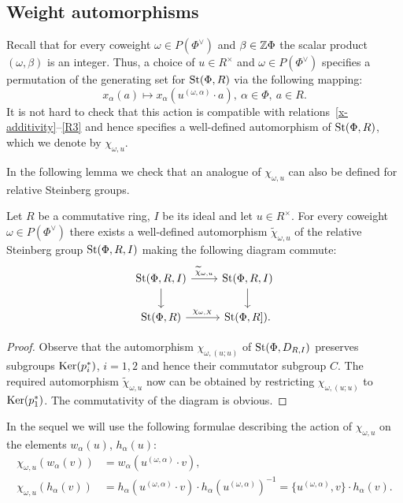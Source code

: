 \subsection{Weight automorphisms}\label{subsec:weight-automorphisms}
Recall that for every coweight $\omega \in P(\Phi^\vee)$ and $\beta \in \mathbb{Z} \Phi$ the scalar product $(\omega, \beta)$ is an integer.
Thus, a choice of $u \in R^\times$ and $\omega \in P(\Phi^\vee)$ specifies a permutation of the generating set for $\operatorname{St}(\Phi, R)$ via the following mapping:
\begin{equation*} x_\alpha(a) \mapsto x_\alpha(u^{(\omega, \alpha)} \cdot a),\ \alpha\in \Phi,\ a \in R. \end{equation*}
It is not hard to check that this action is compatible with relations~\eqref{x-additivity}--\eqref{R3} and hence specifies a well-defined automorphism of $\operatorname{St}(\Phi, R)$, which we denote by $\chi_{\omega, u}$.

In the following lemma we check that an analogue of $\chi_{\omega, u}$ can also be defined for relative Steinberg groups.
\begin{lemma} \label{lem:relative-chi}
Let $R$ be a commutative ring, $I$ be its ideal and let $u \in R^\times$.
For every coweight $\omega \in P(\Phi^\vee)$ there exists a well-defined automorphism $\widetilde{\chi}_{\omega, u}$ of the relative Steinberg group $\operatorname{St}(\Phi, R, I)$ making the following diagram commute:
\[\begin{tikzcd} \St(\Phi, R, I) \ar[r, "\widetilde{\chi}_{\omega, u}"] \ar[d] & \St(\Phi, R, I) \ar[d] \\
                 \St(\Phi, R) \ar[r, "\chi_{\omega, X}"] & \St(\Phi, R]). \end{tikzcd}\]
\end{lemma}
\begin{proof}
    Observe that the automorphism $\chi_{\omega, (u; u)}$ of $\operatorname{St}(\Phi, D_{R, I})$ preserves subgroups
     $\operatorname{Ker}(p_i^*)$, $i=1, 2$ and hence their commutator subgroup $C$.
    The required automorphism $\widetilde{\chi}_{\omega, u}$ now can be obtained by restricting $\chi_{\omega, (u; u)}$ to $\operatorname{Ker}(p_1^*)$.
    The commutativity of the diagram is obvious.
\end{proof}

In the sequel we will use the following formulae describing the action of $\chi_{\omega, u}$ on the elements $w_\alpha(u)$, $h_\alpha(u)$:
\begin{align}
    \label{eq:chi-w} \chi_{\omega, u}\left(w_\alpha(v)\right) &= w_\alpha(u^{(\omega, \alpha)} \cdot v), \\
    \label{eq:chi-h} \chi_{\omega, u} (h_\alpha(v)) &= h_\alpha(u^{(\omega, \alpha)} \cdot v) \cdot h_\alpha(u^{(\omega, \alpha)})^{-1} = \{u^{(\omega, \alpha)}, v\} \cdot h_\alpha(v).
\end{align}

